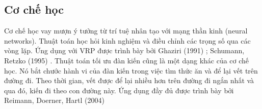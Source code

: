 \subsection{Cơ chế học}

Cơ chế học vay mượn ý tưởng từ trí tuệ nhân tạo với mạng thần kinh (neural networks). Thuật toán học hỏi kinh nghiệm và điều chỉnh các trọng số qua các vòng lặp. Ứng dụng với VRP được trình bày bởi Ghaziri (1991) \cite{ghaziri1991solving}; Schumann, Retzko (1995) \cite{schumann1995self}. Thuật toán tối ưu đàn kiến cũng là một dạng khác của cơ chế học. Nó bắt chước hành vi của đàn kiến trong việc tìm thức ăn và để lại vết trên đường đi. Theo thời gian, vết được để lại nhiều hơn trên đường đi ngắn nhất và qua đó, kiến đi theo con đường này. Ứng dụng đầy đủ được trình bày bởi Reimann, Doerner, Hartl (2004) \cite{reimann2004d}


